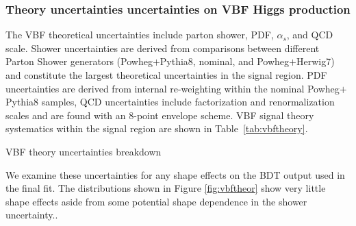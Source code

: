 \subsubsection{Theory uncertainties uncertainties on VBF Higgs production}
The VBF theoretical uncertainties include parton shower, PDF, $\alpha_s$, and QCD scale. Shower uncertainties are derived from comparisons between different Parton Shower generators (Powheg$+$Pythia8, nominal, and Powheg$+$Herwig7) and constitute the largest theoretical uncertainties in the signal region. PDF uncertainties are derived from internal re-weighting within the nominal Powheg$+$Pythia8 samples, QCD uncertainties include factorization and renormalization scales and are found with an 8-point envelope scheme. VBF signal theory systematics within the signal region are shown in Table~\ref{tab:vbftheory}.

\begin{table}[h!]
\centering
\scalebox{1.0}{

}
\caption{VBF theory uncertainties breakdown}
\label{tab:vbftheory}
\end{table}

We examine these uncertainties for any shape effects on the BDT output used in the final fit. The distributions shown in Figure \ref{fig:vbftheor} show very little shape effects aside from some potential shape dependence in the shower uncertainty..


